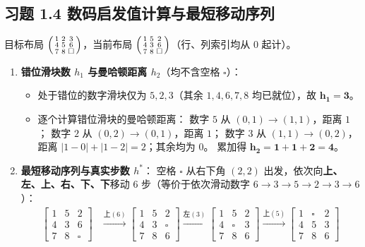 \subsection*{习题 1.4 数码启发值计算与最短移动序列}
目标布局 $\begin{psmallmatrix}1&2&3\\4&5&6\\7&8&\square\end{psmallmatrix}$，当前布局 $\begin{psmallmatrix}1&5&2\\4&3&6\\7&8&\square\end{psmallmatrix}$（行、列索引均从 $0$ 起计）。
\begin{enumerate}[label=(\arabic*), leftmargin=1.8em]
  \item \textbf{错位滑块数 $h_1$ 与曼哈顿距离 $h_2$}（均不含空格 $\square$）：
  \begin{itemize}
    \item 处于错位的数字滑块仅为 $5, 2, 3$（其余 $1, 4, 6, 7, 8$ 均已就位），故 $\mathbf{h_1 = 3}$。
    \item 逐个计算错位滑块的曼哈顿距离：
      数字 $5$ 从 $(0,1)\to(1,1)$，距离 $1$；
      数字 $2$ 从 $(0,2)\to(0,1)$，距离 $1$；
      数字 $3$ 从 $(1,1)\to(0,2)$，距离 $|1-0|+|1-2| = 2$；其余均为 $0$。
      累加得 $\mathbf{h_2 = 1 + 1 + 2 = 4}$。
  \end{itemize}
  \item \textbf{最短移动序列与真实步数 $h^*$}：
  空格 $\square$ 从右下角 $(2,2)$ 出发，依次向\textbf{上、左、上、右、下、下}移动 6 步（等价于依次滑动数字 $6 \to 3 \to 5 \to 2 \to 3 \to 6$）：
  \begin{align*}
    \begin{bmatrix}1&5&2\\4&3&6\\7&8&\square\end{bmatrix}
    &\xrightarrow{\text{上}(6)}
    \begin{bmatrix}1&5&2\\4&3&\square\\7&8&6\end{bmatrix}
    \xrightarrow{\text{左}(3)}
    \begin{bmatrix}1&5&2\\4&\square&3\\7&8&6\end{bmatrix}
    \xrightarrow{\text{上}(5)}
    \begin{bmatrix}1&\square&2\\4&5&3\\7&8&6\end{bmatrix} \\

\end{align*}
\end{enumerate}
